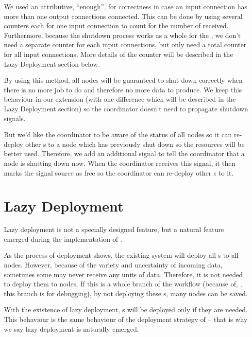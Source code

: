 We used an attributive, ``enough'', for correctness in case an input connection has more than one output connections connected. This can be done by using several counters each for one input connection to count for the number of \dEOS received. Furthermore, because the shutdown process works as a whole for the \tPEInst, we don't need a separate counter for each input connections, but only need a total counter for all input connections. More details of the counter will be described in the Lazy Deployment section below.

By using this method, all nodes will be guaranteed to shut down correctly when there is no more job to do and therefore no more data to produce. We keep this behaviour in our extension (with one difference which will be described in the Lazy Deployment section) so the coordinator doesn't need to propagate shutdown signals.

But we'd like the coordinator to be aware of the status of all nodes so it can re-deploy other \tPEInst{}s to a node which has previously shut down so the resources will be better used. Therefore, we add an additional signal to tell the coordinator that a node is shutting down now. When the coordinator receives this signal, it then marks the signal source as free so the coordinator can re-deploy other \tPEInst{}s to it.

\section{Lazy Deployment}
Lazy deployment is not a specially designed feature, but a natural feature emerged during the implementation of \tincdep.

As the process of deployment shows, the existing \dpy system will deploy all \tPEInst{}s to all nodes. However, because of the variety and uncertainty of incoming data, sometimes some \tPEInst may never receive any units of data. Therefore, it is not needed to deploy them to nodes. If this is a whole branch of the workflow (because of, \eg, this branch is for debugging), by not deploying these \tPEInst{}s, many nodes can be saved.

With the existence of lazy deployment, \tPEInst{}s will be deployed only if they are needed. This behaviour is the same behaviour of the deployment strategy of \tincdep -- that is why we say lazy deployment is naturally emerged.

